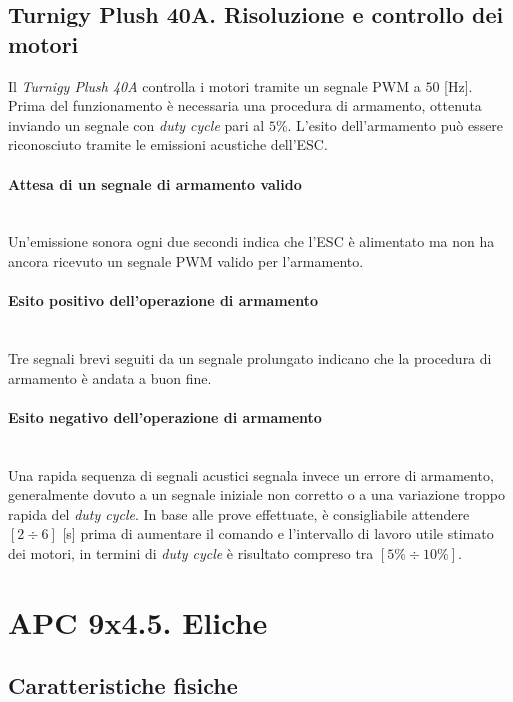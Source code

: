 \documentclass[11pt]{report}
\begin{document}
	\subsection{Turnigy Plush 40A. Risoluzione e controllo dei motori}
	\label{ESCRisoluzioneEControllo}
	Il \textit{Turnigy Plush 40A} controlla i motori tramite un segnale PWM a $50$ [Hz]. Prima del funzionamento è necessaria una procedura di armamento, ottenuta inviando un segnale con \textit{duty cycle} pari al $5\%$.
	L'esito dell'armamento può essere riconosciuto tramite le emissioni acustiche dell'ESC.
	
	\paragraph{\small{Attesa di un segnale di armamento valido}}\mbox{}\\
	Un'emissione sonora ogni due secondi indica che l'ESC è alimentato ma non ha ancora ricevuto un segnale PWM valido per l'armamento.
	
	\paragraph{\small{Esito positivo dell'operazione di armamento}}\mbox{}\\
	Tre segnali brevi seguiti da un segnale prolungato indicano che la procedura di armamento è andata a buon fine.
	
	\paragraph{\small{Esito negativo dell'operazione di armamento}}\mbox{}\\
	Una rapida sequenza di segnali acustici segnala invece un errore di armamento, generalmente dovuto a un segnale iniziale non corretto o a una variazione troppo rapida del \textit{duty cycle}. In base alle prove effettuate, è consigliabile attendere $[2\div6]$ [s] prima di aumentare il comando e l'intervallo di lavoro utile stimato dei motori, in termini di \textit{duty cycle} è risultato compreso tra $[5\%\div10\%]$.
	
	\section{APC 9x4.5. Eliche}
	\subsection{Caratteristiche fisiche}
\end{document}
